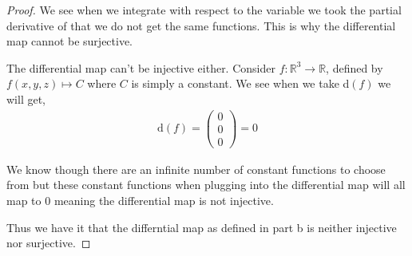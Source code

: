 \documentclass[12pt]{article}
\newcommand      {\Rm}         {{\mathbb R}}
\begin{document}
\begin{itemize}
\begin{itemize}
\begin{proof}
            We see when we integrate with respect to the variable we took the partial derivative of that we do not get the same functions. This is why the differential map cannot be surjective. 


            The differential map can't be injective either. Consider $f: \Rm^3 \to \Rm$, defined by $f(x,y,z) \mapsto C$ where $C$ is simply a constant. We see when we take d$(f)$ we will get,
            \begin{align*}
                \text{d}(f) = \begin{pmatrix}0\\ 0\\ 0 \end{pmatrix} = 0
            \end{align*}

            We know though there are an infinite number of constant functions to choose from but these constant functions when plugging into the differential map will all map to 0 meaning the differential map is not injective. 

            Thus we have it that the differntial map as defined in part b is neither injective nor surjective. 

        \end{proof}
        
        
    \end{itemize}    
\end{itemize}
\end{document}
